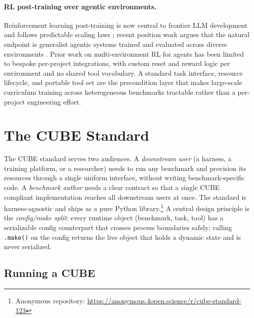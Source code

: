 \documentclass{article}
\begin{document}
\paragraph{RL post-training over agentic environments.}
Reinforcement learning post-training is now central to frontier LLM development and
follows predictable scaling laws \citep{Khatri2025TheAO}; recent position work argues that
the natural endpoint is generalist agentic systems trained and evaluated across diverse
environments \citep{bandel2026agentic}. Prior work on multi-environment RL for agents
has been limited to bespoke per-project integrations, with custom reset and reward logic
per environment and no shared tool vocabulary. A standard task interface, resource
lifecycle, and portable tool set are the precondition layer that makes large-scale
curriculum training across heterogeneous benchmarks tractable rather than a per-project
engineering effort.


\section{The CUBE Standard}
\label{sec:standard}

The CUBE standard serves two audiences. A \emph{downstream user} (a harness,
a training platform, or a researcher) needs to run any benchmark and provision its resources through a single uniform interface, without writing benchmark-specific code.
A \emph{benchmark author} needs a clear contract so that a single CUBE compliant implementation reaches all downstream users at once.
The standard is harness-agnostic and ships as a pure Python library.\footnote{%
  Anonymous repository: \url{https://anonymous.4open.science/r/cube-standard-123}}
A central design principle is the \emph{config/make split}: every runtime
object (benchmark, task, tool) has a serializable config counterpart that
crosses process boundaries safely; calling \texttt{.make()} on the config
returns the live object that holds a dynamic state and is never serialized.

\subsection{Running a CUBE}
\label{sec:standard-user}
\end{document}
